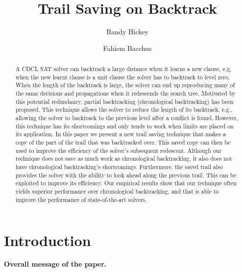 \documentclass[runningheads]{llncs}
\title{Trail Saving on Backtrack}
\author{Randy Hickey \and Fahiem Bacchus}
\institute{Department of Computer Science, University of Toronto, Canada\\
  \email{rgh000@gmail.com, fbacchus@cs.toronto.edu}}
\newcommand{\sat}{SAT\xspace}
\begin{document}
\maketitle
\begin{abstract}
    A CDCL \sat solver can backtrack a large distance when it learns a
    new clause, e.g, when the new learnt clause is a unit clause the
    solver has to backtrack to level zero. When the length of the
    backtrack is large, the solver can end up reproducing many of the
    same decisions and propagations when it redescends the search
    tree. Motivated by this potential redundancy, partial backtracking
    (chronological backtracking) has been proposed. This technique
    allows the solver to reduce the length of its backtrack, e.g.,
    allowing the solver to backtrack to the previous level after a
    conflict is found. However, this technique has its shortcomings
    and only tends to work when limits are placed on its
    application. In this paper we present a new trail saving technique
    that makes a copy of the part of the trail that was backtracked
    over. This saved copy can then be used to improve the efficiency
    of the solver's subsequent redescent. Although our technique does
    not save as much work as chronological backtracking, it also does
    not have chronological backtracking's shortcomings. Furthermore,
    the saved trail also provides the solver with the ability to look
    ahead along the previous trail. This can be exploited to improve
    its efficiency. Our empirical results show that our technique
    often yields superior performance over chronological backtracking,
    and that is able to improve the performance of state-of-the-art
    solvers.

\end{abstract}

\section{Introduction}
\textbf{Overall message of the paper.}


\end{document}
